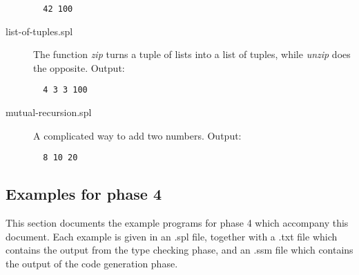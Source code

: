 \documentclass[a4paper]{article}
\begin{document}
\begin{description}
  \begin{verbatim}
  42 100
  \end{verbatim}

  \item[list-of-tuples.spl] The function \emph{zip} turns a tuple of lists into
  a list of tuples, while \emph{unzip} does the opposite. Output:

  \begin{verbatim}
  4 3 3 100
  \end{verbatim}

  \item[mutual-recursion.spl] A complicated way to add two numbers. Output:

  \begin{verbatim}
  8 10 20
  \end{verbatim}

\end{description}

\subsection{Examples for phase 4}
\label{sec_examplesPhase4}

This section documents the example programs for phase 4 which accompany this
document.  Each example is given in an .spl file, together with a .txt file
which contains the output from the type checking phase, and an .ssm file which
contains the output of the code generation phase.
\end{document}
